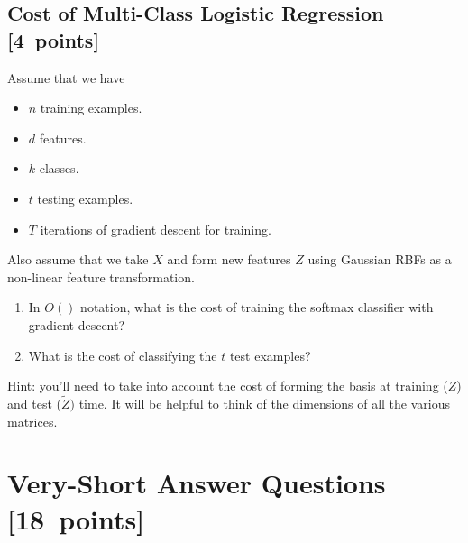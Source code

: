 \documentclass{article}
\newcommand{\blu}[1]{{\textcolor{blu}{#1}}}
\let\ask\blu
\newcommand\pts[1]{\textcolor{pointscolour}{[#1~points]}}
\begin{document}
\subsection{Cost of Multi-Class Logistic Regression \pts{4}}

Assume that we have
\begin{itemize}
    \item $n$ training examples.
    \item $d$ features.
    \item $k$ classes.
    \item $t$ testing examples.
    \item $T$ iterations of gradient descent for training.
\end{itemize}
Also assume that we take $X$ and form new features $Z$ using Gaussian RBFs as a non-linear feature transformation.
\begin{enumerate}
\item \ask{In $O()$ notation, what is the cost of training the softmax classifier with gradient descent?}
\item \ask{What is the cost of classifying the $t$ test examples?}
\end{enumerate}
Hint: you'll need to take into account the cost of forming the basis at training ($Z$) and test ($\tilde{Z})$ time. It will be helpful to think of the dimensions of all the various matrices.



\clearpage
\section{Very-Short Answer Questions \pts{18}}
\end{document}

